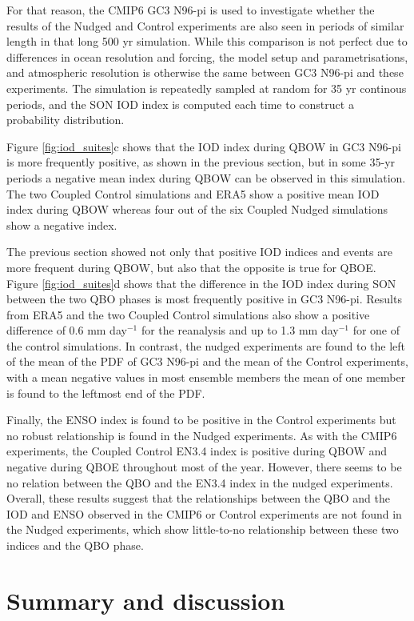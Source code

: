 For that reason, the CMIP6 GC3 N96-pi is used to investigate whether the results of the Nudged and Control experiments are also seen in periods of similar length in that long 500 yr simulation. While this comparison is not perfect due to differences in ocean resolution and forcing, the model setup and parametrisations, and atmospheric resolution is otherwise the same between GC3 N96-pi and these experiments. 
The simulation is repeatedly sampled at random for 35 yr continous periods, and the SON IOD index is computed each time to construct a probability distribution.  

Figure \ref{fig:iod_suites}c shows that the IOD index during QBOW in GC3 N96-pi is more frequently positive, as shown in the previous section, but in some 35-yr periods a negative mean index during QBOW can be observed in this simulation. The two Coupled Control simulations and ERA5 show a positive mean IOD index during QBOW whereas four out of the six Coupled Nudged simulations show a negative index. 

The previous section showed not only that positive IOD indices and events are more frequent during QBOW, but also that the opposite is true for QBOE. Figure \ref{fig:iod_suites}d  shows that the difference in the IOD index during SON between the two QBO phases is most frequently positive in GC3 N96-pi.  
Results from ERA5 and the two Coupled Control simulations also show a positive difference of 0.6 mm day$^{-1}$ for the reanalysis and up to 1.3 mm day$^{-1}$ for one of the control simulations. 
In contrast, the nudged experiments are found to the left of the mean of the PDF of GC3 N96-pi and the mean of the Control experiments, with a mean negative values in most ensemble members the mean of one member is found to the leftmost end of the PDF. 

Finally, the ENSO index is found to be positive in the Control experiments but no robust relationship is found in the Nudged experiments. As with the CMIP6 experiments, the Coupled Control EN3.4 index is positive during QBOW and negative during QBOE throughout most of the year. However, there seems to be no relation between the QBO and the EN3.4 index in the nudged experiments. 
Overall, these results suggest that the relationships between the QBO and the IOD and ENSO observed in the CMIP6 or Control experiments are not found in the Nudged experiments, which show little-to-no relationship between these two indices and the QBO phase.

\section{Summary and discussion}

